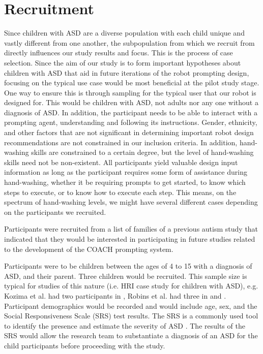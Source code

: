 \documentclass{ut-thesis}
\begin{document}
\section{Recruitment}
\label{sec:Recruitment}
Since children with ASD are a diverse population with each child unique and vastly different from one another, the subpopulation from which we recruit from directly influences our study results and focus.  This is the process of case selection.  Since the aim of our study is to form important hypotheses about children with ASD that aid in future iterations of the robot prompting design, focusing on the typical use case would be most beneficial at the pilot study stage.  One way to ensure this is through sampling for the typical user that our robot is designed for.  This would be children with ASD, not adults nor any one without a diagnosis of ASD.  In addition, the participant needs to be able to interact with a prompting agent, understanding and following its instructions.  Gender, ethnicity, and other factors that are not significant in determining important robot design recommendations are not constrained in our inclusion criteria.  In addition, hand-washing skills are constrained to a certain degree, but the level of hand-washing skills need not be non-existent.  All participants yield valuable design input information as long as the participant requires some form of assistance during hand-washing, whether it be requiring prompts to get started, to know which steps to execute, or to know how to execute each step.  This means, on the spectrum of hand-washing levels, we might have several different cases depending on the participants we recruited.

Participants were recruited from a list of families of a previous autism study that indicated that they would be interested in participating in future studies related to the development of the COACH prompting system.

Participants were to be children between the ages of 4 to 15 with a diagnosis of ASD, and their parent. Three children would be recruited. This sample size is typical for studies of this nature (i.e. HRI case study for children with ASD), e.g. Kozima et al. had two participants in
\cite{kozima2005interactive}, Robins et al. had three in \cite{robins2004robot} and \cite{robins2009isolation}.  Participant demographics would be recorded and would include age, sex, and the Social Responsiveness Scale (SRS) test results.  The SRS is a commonly used tool to identify the presence and estimate the severity of ASD \cite{constantino2002social}. The results of the SRS would allow the research team to substantiate a diagnosis of an ASD for the child participants before proceeding with the study.
\end{document}
